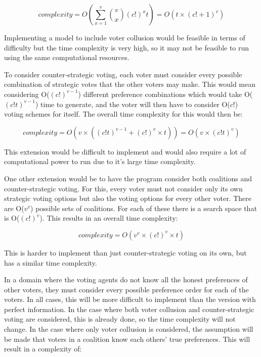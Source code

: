 \begin{equation}\label{eqn:coal}
    complexity = O(\sum^v_{x=1}{\binom{v}{x}(c!)^x t}) = O(t \times (c! + 1)^v)
\end{equation}

Implementing a model to include voter collusion would be feasible in terms of difficulty but the time complexity is very high, so it may not be feasible to run using the same computational resources.

To consider counter-strategic voting, each voter must consider every possible combination of strategic votes that the other voters may make. This would mean considering O($(c!)^{v-1}$) different preference combinations which would take O($(c!t)^{v-1}$) time to generate, and the voter will then have to consider O($c!$) voting schemes for itself. The overall time complexity for this would then be:

\begin{equation}\label{eqn:costr}
    complexity = O(v \times ((c!t)^{v-1} + (c!)^{v} \times t)) = O(v \times (c!t)^v)
\end{equation}

This extension would be difficult to implement and would also require a lot of computational power to run due to it's large time complexity.

One other extension would be to have the program consider both coalitions and counter-strategic voting. For this, every voter must not consider only its own strategic voting options but also the voting options for every other voter. There are O($v^v$) possible sets of coalitions. For each of these there is a search space that is O($(c!)^v$). This results in an overall time complexity:

\begin{equation}\label{eqn:both}
    complexity = O(v^v \times (c!)^v \times t)
\end{equation}

This is harder to implement than just counter-strategic voting on its own, but has a similar time complexity.

In a domain where the voting agents do not know all the honest preferences of other voters, they must consider every possible preference order for each of the voters. In all cases, this will be more difficult to implement than the version with perfect information. In the case where both voter collusion and counter-strategic voting are considered, this is already done, so the time complexity will not change. In the case where only voter collusion is considered, the assumption will be made that voters in a coalition know each others' true preferences. This will result in a complexity of:

